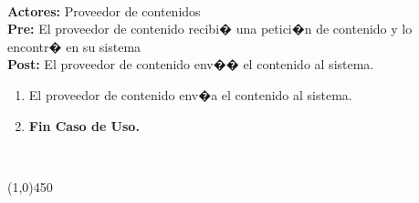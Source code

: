 \documentclass[11pt, a4paper, spanish]{article}
\begin{document}
{ \\ \textbf{Actores:} Proveedor de contenidos \\ \textbf{Pre:} El proveedor de contenido recibi� una petici�n de contenido y lo encontr� en su sistema \\ \textbf{Post:} El proveedor de contenido env�� el contenido al sistema.\\  \begin{enumerate} \item El proveedor de contenido env�a el contenido al sistema. \item \textbf{Fin Caso de Uso.} \end{enumerate}  \\  \begin{center} \line(1,0){450} \end{center}


}
\end{document}
